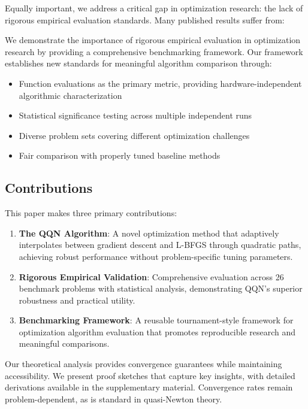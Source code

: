 Equally important, we address a critical gap in optimization research: the lack of rigorous empirical evaluation standards. Many published results suffer from:

We demonstrate the importance of rigorous empirical evaluation in optimization research by providing a comprehensive benchmarking framework. Our framework establishes new standards for meaningful algorithm comparison through:

\begin{itemize}
\tightlist
\item
  Function evaluations as the primary metric, providing hardware-independent algorithmic characterization
\item
  Statistical significance testing across multiple independent runs
\item
  Diverse problem sets covering different optimization challenges
\item
  Fair comparison with properly tuned baseline methods
\end{itemize}

\hypertarget{contributions}{%
\subsection{Contributions}\label{contributions}}

This paper makes three primary contributions:

\begin{enumerate}
\def\labelenumi{\arabic{enumi}.}
\item
  \textbf{The QQN Algorithm}: A novel optimization method that adaptively interpolates between gradient descent and L-BFGS through quadratic paths, achieving robust performance without problem-specific tuning parameters.
\item
  \textbf{Rigorous Empirical Validation}: Comprehensive evaluation across 26 benchmark problems with statistical analysis, demonstrating QQN's superior robustness and practical utility.
\item
  \textbf{Benchmarking Framework}: A reusable tournament-style framework for optimization algorithm evaluation that promotes reproducible research and meaningful comparisons.
\end{enumerate}

Our theoretical analysis provides convergence guarantees while maintaining accessibility.
We present proof sketches that capture key insights, with detailed derivations available in the supplementary material.
Convergence rates remain problem-dependent, as is standard in quasi-Newton theory.

